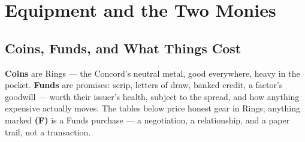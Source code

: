 %
%

\chapter{Equipment and the Two Monies}

\section{Coins, Funds, and What Things Cost}

\textbf{Coins} are Rings --- the Concord's neutral metal, good everywhere, heavy in the pocket. \textbf{Funds} are promises: scrip, letters of draw, banked credit, a factor's goodwill --- worth their issuer's health, subject to the spread, and how anything expensive actually moves. The tables below price honest gear in Rings; anything marked \textbf{(F)} is a Funds purchase --- a negotiation, a relationship, and a paper trail, not a transaction.

